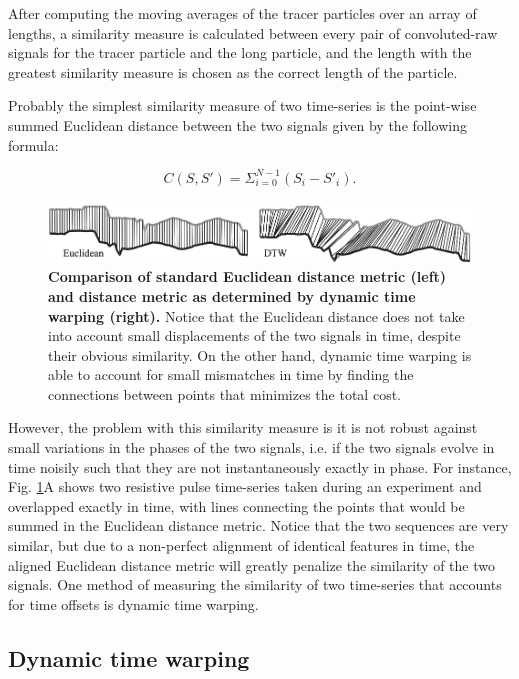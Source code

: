 		
		After computing the moving averages of the tracer particles over an array of lengths, a similarity measure is calculated between every pair of convoluted-raw signals for the tracer particle and the long particle, and the length with the greatest similarity measure is chosen as the correct length of the particle.
		
		Probably the simplest similarity measure of two time-series is the point-wise summed Euclidean distance between the two signals given by the following formula:
		
		\begin{equation}\label{eq:euclideandistance}
			C\left(S, S'\right)=\Sigma_{i=0}^{N-1}\left(S_{i}-S'_{i}\right).
		\end{equation}
		
		\begin{figure}
			\includegraphics[width=\textwidth]{eucliddtw}
			\caption{\textbf{Comparison of standard Euclidean distance metric (left) and distance metric as determined by dynamic time warping (right).} Notice that the Euclidean distance does not take into account small displacements of the two signals in time, despite their obvious similarity. On the other hand, dynamic time warping is able to account for small mismatches in time by finding the connections between points that minimizes the total cost.}
			\label{fig:eucliddtw}
		\end{figure}

		
		However, the problem with this similarity measure is it is not robust against small variations in the phases of the two signals, i.e. if the two signals evolve in time noisily such that they are not instantaneously exactly in phase. For instance, Fig. \ref{fig:eucliddtw}A shows two resistive pulse time-series taken during an experiment and overlapped exactly in time, with lines connecting the points that would be summed in the Euclidean distance metric\cite{Keogh2005}. Notice that the two sequences are very similar, but due to a non-perfect alignment of identical features in time, the aligned Euclidean distance metric will greatly penalize the similarity of the two signals. One method of measuring the similarity of two time-series that accounts for time offsets is dynamic time warping.
		
		\subsection{Dynamic time warping}
		
